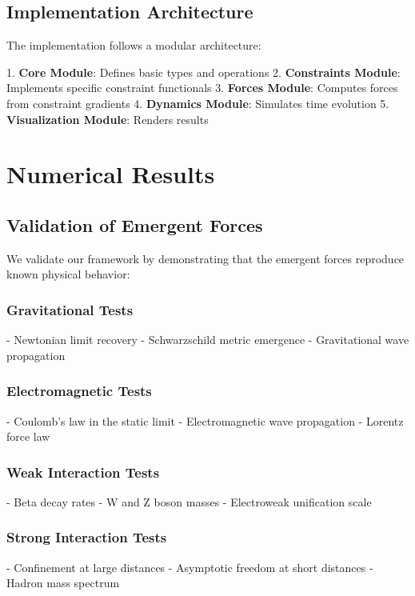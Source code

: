 \documentclass[11pt,a4paper]{article}
\begin{document}
\subsection{Implementation Architecture}

The implementation follows a modular architecture:

1. \textbf{Core Module}: Defines basic types and operations
2. \textbf{Constraints Module}: Implements specific constraint functionals
3. \textbf{Forces Module}: Computes forces from constraint gradients
4. \textbf{Dynamics Module}: Simulates time evolution
5. \textbf{Visualization Module}: Renders results

\section{Numerical Results}

\subsection{Validation of Emergent Forces}

We validate our framework by demonstrating that the emergent forces reproduce known physical behavior:

\subsubsection{Gravitational Tests}
- Newtonian limit recovery
- Schwarzschild metric emergence
- Gravitational wave propagation

\subsubsection{Electromagnetic Tests}
- Coulomb's law in the static limit
- Electromagnetic wave propagation
- Lorentz force law

\subsubsection{Weak Interaction Tests}
- Beta decay rates
- W and Z boson masses
- Electroweak unification scale

\subsubsection{Strong Interaction Tests}
- Confinement at large distances
- Asymptotic freedom at short distances
- Hadron mass spectrum
\end{document}
